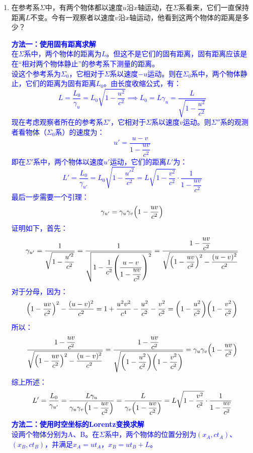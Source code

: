 \documentclass[a4paper]{article}
\begin{document}
\begin{enumerate}
    \item 在参考系$\Sigma$中，有两个物体都以速度$u$沿$x$轴运动，在$\Sigma$系看来，它们一直保持距离$L$不变。今有一观察者以速度$v$沿$x$轴运动，他看到这两个物体的距离是多少？

    \textcolor{blue}{
        \textbf{方法一：使用固有距离求解} \\
        在$\Sigma$系中，两个物体的距离为$L$。但这不是它们的固有距离，固有距离应该是在“相对两个物体静止”的参考系下测量的距离。 \\
        设这个参考系为$\Sigma_0$，它相对于$\Sigma$系以速度$-u$运动。则在$\Sigma_0$系中，两个物体静止，它们的距离为固有距离$L_0$。由长度收缩公式，有：
        \[
            L = \frac{L_0}{\gamma_u} = L_0 \sqrt{1 - \frac{u^2}{c^2}} \implies L_0 = L\gamma_u = \frac{L}{\sqrt{1 - \dfrac{u^2}{c^2}}}
        \]
        现在考虑观察者所在的参考系$\Sigma'$，它相对于$\Sigma$系以速度$v$运动。则$\Sigma''$系的观测者看物体（$\Sigma_0$系）的速度为：
        \[
            u' = \frac{u - v}{1-\dfrac{uv}{c^2}}
        \]
        即在$\Sigma'$系中，两个物体以速度$u'$运动，它们的距离$L'$为：
        \[
            L' = \frac{L_0}{\gamma_{u'}} = L_0 \sqrt{1 - \frac{u'^2}{c^2}} = L \sqrt{1 - \frac{v^2}{c^2}} \cdot \frac{1}{1 - \dfrac{uv}{c^2}}
        \]
        最后一步需要一个引理：
        \[
            \gamma_{u'} = \gamma_u \gamma_v \qty(1 - \frac{uv}{c^2})
        \]
        证明如下，首先：
        \[
            \gamma_{u'} = \frac{1}{\sqrt{1 - \dfrac{u'^2}{c^2}}} = \frac{1}{\sqrt{1 - \dfrac{1}{c^2} \qty(\dfrac{u-v}{1-\dfrac{uv}{c^2}})^2}} = \frac{1 - \dfrac{uv}{c^2}}{\sqrt{\qty(1 - \dfrac{uv}{c^2})^2 - \dfrac{(u-v)^2}{c^2}}}
        \]
        对于分母，因为：
        \[
            \qty(1 - \dfrac{uv}{c^2})^2 - \dfrac{(u-v)^2}{c^2} = 1 + \frac{u^2 v^2}{c^4} - \frac{u^2}{c^2} - \frac{v^2}{c^2} = \qty(1 - \frac{u^2}{c^2}) \qty(1 - \frac{v^2}{c^2})
        \]
        所以：
        \[
            \frac{1 - \dfrac{uv}{c^2}}{\sqrt{\qty(1 - \dfrac{uv}{c^2})^2 - \dfrac{(u-v)^2}{c^2}}} = \frac{1 - \dfrac{uv}{c^2}}{\sqrt{\qty(1 - \dfrac{u^2}{c^2}) \qty(1 - \dfrac{v^2}{c^2})}} = \gamma_u \gamma_v \qty(1 - \frac{uv}{c^2})
        \]
        综上所述：
        \[
            L' = \frac{L_0}{\gamma_{u'}} = \frac{L\gamma_u}{\gamma_u \gamma_v \qty(1 - \dfrac{uv}{c^2})} = \frac{L}{\gamma_v \qty(1 - \dfrac{uv}{c^2})} = L \sqrt{1 - \frac{v^2}{c^2}} \cdot \frac{1}{1 - \dfrac{uv}{c^2}}
        \]
        \textbf{方法二：使用时空坐标的Lorentz变换求解} \\
        设两个物体分别为A、B。在$\Sigma$系中，两个物体的位置分别为$(x_A, ct_A)$、$(x_B, ct_B)$，并满足$x_A = ut_A$，$x_B = ut_B + L$。 \\
}
\end{enumerate}
\end{document}
